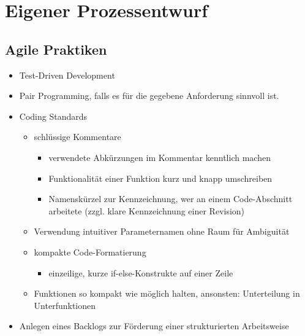 \documentclass[a4paper, 11pt]{article}
\begin{document}
\section{Eigener Prozessentwurf}
\subsection{Agile Praktiken}
\begin{itemize}
    \item Test-Driven Development
    \item Pair Programming, falls es für die gegebene Anforderung sinnvoll ist.
    \item Coding Standards
    \begin{itemize}
        \item schlüssige Kommentare
        \begin{itemize}
            \item verwendete Abkürzungen im Kommentar kenntlich machen
            \item Funktionalität einer Funktion kurz und knapp umschreiben
            \item Namenskürzel zur Kennzeichnung, wer an einem Code-Abschnitt arbeitete (zzgl. klare Kennzeichnung einer Revision)
        \end{itemize}
        \item Verwendung intuitiver Parameternamen ohne Raum für Ambiguität
        \item kompakte Code-Formatierung
        \begin{itemize}
            \item einzeilige, kurze if-else-Konstrukte auf einer Zeile
        \end{itemize}
        \item Funktionen so kompakt wie möglich halten, ansonsten: Unterteilung in Unterfunktionen
    \end{itemize}
    \item Anlegen eines Backlogs zur Förderung einer strukturierten Arbeitsweise
\end{itemize}
\end{document}
